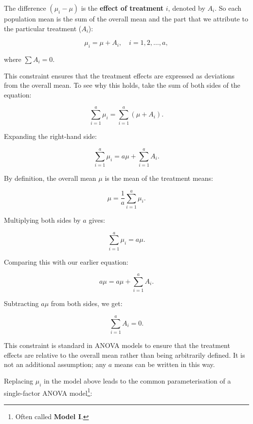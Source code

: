 \documentclass[
  letterpaper,
]{book}
\begin{document}
The difference \((\mu_i - \mu)\) is the \textbf{effect of treatment}
\(i\), denoted by \(A_i\). So each population mean is the sum of the
overall mean and the part that we attribute to the particular treatment
(\(A_i\)):

\[
\mu_i = \mu + A_i, \quad i = 1, 2, \dots, a,
\]

where \(\sum A_i = 0\).

\begin{tcolorbox}[enhanced jigsaw, title={Why the \(\sum A_i = 0\) constraint?}, opacityback=0, arc=.35mm, coltitle=black, leftrule=.75mm, left=2mm, titlerule=0mm, breakable, colback=white, opacitybacktitle=0.6, colframe=quarto-callout-caution-color-frame, bottomrule=.15mm, colbacktitle=quarto-callout-caution-color!10!white, bottomtitle=1mm, toptitle=1mm, rightrule=.15mm, toprule=.15mm]

This constraint ensures that the treatment effects are expressed as
deviations from the overall mean. To see why this holds, take the sum of
both sides of the equation:

\[
\sum_{i=1}^{a} \mu_i = \sum_{i=1}^{a} (\mu + A_i).
\]

Expanding the right-hand side:

\[
\sum_{i=1}^{a} \mu_i = a\mu + \sum_{i=1}^{a} A_i.
\]

By definition, the overall mean \(\mu\) is the mean of the treatment
means:

\[
\mu = \frac{1}{a} \sum_{i=1}^{a} \mu_i.
\]

Multiplying both sides by \(a\) gives:

\[
\sum_{i=1}^{a} \mu_i = a\mu.
\]

Comparing this with our earlier equation:

\[
a\mu = a\mu + \sum_{i=1}^{a} A_i.
\]

Subtracting \(a\mu\) from both sides, we get:

\[
\sum_{i=1}^{a} A_i = 0.
\]

This constraint is standard in ANOVA models to ensure that the treatment
effects are relative to the overall mean rather than being arbitrarily
defined. It is not an additional assumption; any \(a\) means can be
written in this way.

\end{tcolorbox}

Replacing \(\mu_i\) in the model above leads to the common
parameterisation of a single-factor ANOVA model\footnote{Often called
  \textbf{Model I}.}:
\end{document}
